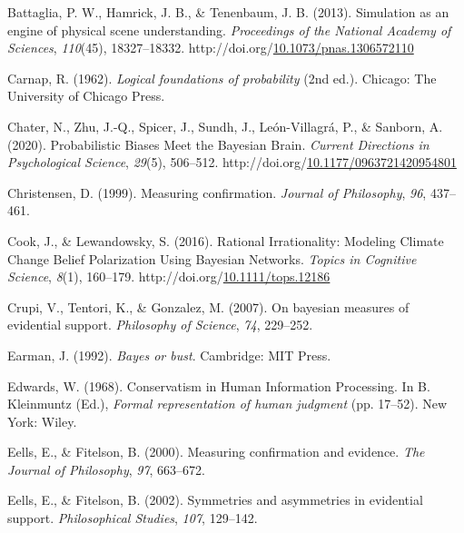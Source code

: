 \documentclass[10pt, letterpaper]{article}
\newenvironment{CSLReferences}%
  {}%
  {\par}
\begin{document}
\hypertarget{refs}{}
\begin{CSLReferences}
\leavevmode{}%
Battaglia, P. W., Hamrick, J. B., \& Tenenbaum, J. B. (2013). Simulation
as an engine of physical scene understanding. \emph{Proceedings of the
National Academy of Sciences}, \emph{110}(45), 18327--18332.
http://doi.org/\href{https://doi.org/10.1073/pnas.1306572110}{10.1073/pnas.1306572110}

\leavevmode{}%
Carnap, R. (1962). \emph{Logical foundations of probability} (2nd ed.).
Chicago: The University of Chicago Press.

\leavevmode{}%
Chater, N., Zhu, J.-Q., Spicer, J., Sundh, J., León-Villagrá, P., \&
Sanborn, A. (2020). Probabilistic {Biases} {Meet} the {Bayesian}
{Brain}. \emph{Current Directions in Psychological Science},
\emph{29}(5), 506--512.
http://doi.org/\href{https://doi.org/10.1177/0963721420954801}{10.1177/0963721420954801}

\leavevmode{}%
Christensen, D. (1999). Measuring confirmation. \emph{Journal of
Philosophy}, \emph{96}, 437--461.

\leavevmode{}%
Cook, J., \& Lewandowsky, S. (2016). Rational {Irrationality}:
{Modeling} {Climate} {Change} {Belief} {Polarization} {Using} {Bayesian}
{Networks}. \emph{Topics in Cognitive Science}, \emph{8}(1), 160--179.
http://doi.org/\href{https://doi.org/10.1111/tops.12186}{10.1111/tops.12186}

\leavevmode{}%
Crupi, V., Tentori, K., \& Gonzalez, M. (2007). On bayesian measures of
evidential support. \emph{Philosophy of Science}, \emph{74}, 229--252.

\leavevmode{}%
Earman, J. (1992). \emph{Bayes or bust}. Cambridge: MIT Press.

\leavevmode{}%
Edwards, W. (1968). Conservatism in {Human} {Information} {Processing}.
In B. Kleinmuntz (Ed.), \emph{Formal representation of human judgment}
(pp. 17--52). New York: Wiley.

\leavevmode{}%
Eells, E., \& Fitelson, B. (2000). Measuring confirmation and evidence.
\emph{The Journal of Philosophy}, \emph{97}, 663--672.

\leavevmode{}%
Eells, E., \& Fitelson, B. (2002). Symmetries and asymmetries in
evidential support. \emph{Philosophical Studies}, \emph{107}, 129--142.


\end{CSLReferences}
\end{document}
